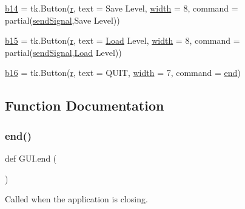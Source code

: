 \begin{DoxyCompactItemize}
\item 
\mbox{\hyperlink{namespace_g_u_i_aa59d8fa69f7030816bf471c883ccf8fc}{b14}} = tk.\+Button(\mbox{\hyperlink{_s_d_l__opengl_8h_a42ce7cdc612e53abee15043f80220d97}{r}}, text = \textquotesingle{}Save Level\textquotesingle{}, \mbox{\hyperlink{_s_d_l__opengl_8h_a9a82cf3caff84cabc4598e2619faac17}{width}} = 8, command = partial(\mbox{\hyperlink{namespace_g_u_i_ae82f740e6453cdd542b52ede1560c2c3}{send\+Signal}},\textquotesingle{}Save Level\textquotesingle{}))
\item 
\mbox{\hyperlink{namespace_g_u_i_a88eaf4fa14b32d5a2a10202a201bbe88}{b15}} = tk.\+Button(\mbox{\hyperlink{_s_d_l__opengl_8h_a42ce7cdc612e53abee15043f80220d97}{r}}, text = \textquotesingle{}\mbox{\hyperlink{_python-ast_8h_a7cc9da6a6307ea8052f27a18bd3d7d5bac40ec5db2990469fc236f4c5dea23edb}{Load}} Level\textquotesingle{}, \mbox{\hyperlink{_s_d_l__opengl_8h_a9a82cf3caff84cabc4598e2619faac17}{width}} = 8, command = partial(\mbox{\hyperlink{namespace_g_u_i_ae82f740e6453cdd542b52ede1560c2c3}{send\+Signal}},\textquotesingle{}\mbox{\hyperlink{_python-ast_8h_a7cc9da6a6307ea8052f27a18bd3d7d5bac40ec5db2990469fc236f4c5dea23edb}{Load}} Level\textquotesingle{}))
\item 
\mbox{\hyperlink{namespace_g_u_i_a676b78f5c42c7f4c6c3e338e078dd0fb}{b16}} = tk.\+Button(\mbox{\hyperlink{_s_d_l__opengl_8h_a42ce7cdc612e53abee15043f80220d97}{r}}, text = \textquotesingle{}Q\+U\+IT\textquotesingle{}, \mbox{\hyperlink{_s_d_l__opengl_8h_a9a82cf3caff84cabc4598e2619faac17}{width}} = 7, command = \mbox{\hyperlink{_s_d_l__opengl_8h_a432111147038972f06e049e18a837002}{end}})
\end{DoxyCompactItemize}


\subsection{Function Documentation}
\mbox{\label{namespace_g_u_i_a6331e60bc4c66b1f0460cd987e6b0d1d}} 
\subsubsection{\texorpdfstring{end()}{end()}}
{\footnotesize\ttfamily def G\+U\+I.\+end (\begin{DoxyParamCaption}{ }\end{DoxyParamCaption})}



Called when the application is closing. 

